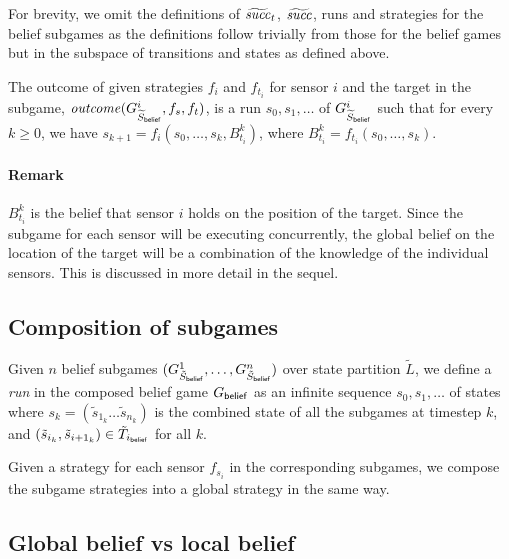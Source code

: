  For brevity, we omit the definitions of $\widetilde{\mathit{succ}}_t$, $\widetilde{\mathit{succ}}$, runs and strategies for the belief subgames as the definitions follow trivially from those for the belief games but in the subspace of transitions and states as defined above.

The outcome of given strategies $f_{i}$ and $f_{t_i}$ for sensor $i$ and the target in the subgame, $\mathit{outcome}(G^{i}_{\widetilde{S}_{\mathsf{belief}}},f_s,f_t)$, is a run $s_0,s_1,\ldots$ of $G^{i}_{\widetilde{S}_{\mathsf{belief}}}$ such that for every $k \geq 0$, we have $s_{k+1} = f_i(s_0,\ldots,s_k,B^k_{t_i})$, where $B^k_{t_i} = f_{t_i}(s_0,\ldots,s_k)$.

\paragraph*{Remark}$B^k_{t_i}$ is the belief that sensor $i$ holds on the position of the target. Since the subgame for each sensor will be executing concurrently, the global belief on the location of the target will be a combination of the knowledge of the individual sensors. This is discussed in more detail in the sequel.

\subsection{Composition of subgames}
Given $n$ belief subgames $(G^{1}_{\tilde{S}_{\mathsf{belief}}},\ldots,G^{n}_{\tilde{S}_{\mathsf{belief}}})$ over state partition $\widetilde{L}$, we define a \emph{run} in the composed belief game $G_{\mathsf{belief}}$ as an infinite sequence $s_0,s_1,\ldots$ of states where $s_k = (\tilde{s}_{1_k} \ldots \tilde{s}_{n_k})$ is the combined state of all the subgames at timestep $k$, and  $(\tilde{s}_{i_k},\tilde{s}_{{i+1}_k}) \in \tilde{T}_{i_{\mathsf{belief}}}$ for all $k$. 

Given a strategy for each sensor $f_{s_i}$ in the corresponding subgames, we compose the subgame strategies into a global strategy in the same way. 


\subsection{Global belief vs local belief}

